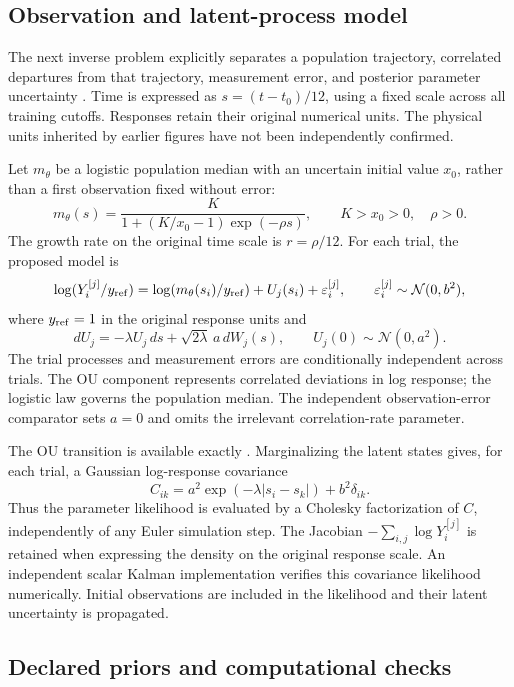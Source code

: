 \subsection{Observation and latent-process model}

    The next inverse problem explicitly separates a population trajectory,
    correlated departures from that trajectory, measurement error, and
    posterior parameter uncertainty \citep{stuart2010inverse}. Time is expressed
    as \(s=(t-t_0)/12\), using a fixed scale across all training cutoffs.
    Responses retain their original numerical units. The physical units
    inherited by earlier figures have not been independently confirmed.

    Let \(m_\theta\) be a logistic population median with an uncertain initial
    value \(x_0\), rather than a first observation fixed without error:
    \[
        m_\theta(s)
        =\frac{K}{1+(K/x_0-1)\exp(-\rho s)},
        \qquad K>x_0>0,\quad \rho>0.
    \]
    The growth rate on the original time scale is \(r=\rho/12\).
    For each trial, the proposed model is
    \[
        \log(Y_i^{[j]}/y_{\rm ref})
        =\log(m_\theta(s_i)/y_{\rm ref})+U_j(s_i)+\varepsilon_i^{[j]},
        \qquad
        \varepsilon_i^{[j]}\sim\mathcal N(0,b^2),
    \]
    where \(y_{\rm ref}=1\) in the original response units and
    \[
        dU_j=-\lambda U_j\,ds+\sqrt{2\lambda}\,a\,dW_j(s),
        \qquad U_j(0)\sim\mathcal N(0,a^2).
    \]
    The trial processes and measurement errors are conditionally independent
    across trials. The OU component represents correlated deviations in log
    response; the logistic law governs the population median. The independent
    observation-error comparator sets \(a=0\) and omits the irrelevant
    correlation-rate parameter.

    The OU transition is available exactly
    \citep{sarkka2019applied}. Marginalizing the latent states gives, for each
    trial, a Gaussian log-response covariance
    \[
        C_{ik}=a^2\exp(-\lambda|s_i-s_k|)+b^2\delta_{ik}.
    \]
    Thus the parameter likelihood is evaluated by a Cholesky factorization of
    \(C\), independently of any Euler simulation step. The Jacobian
    \(-\sum_{i,j}\log Y_i^{[j]}\) is retained when expressing the density on
    the original response scale. An independent scalar Kalman implementation
    verifies this covariance likelihood numerically. Initial observations are
    included in the likelihood and their latent uncertainty is propagated.

\subsection{Declared priors and computational checks}

